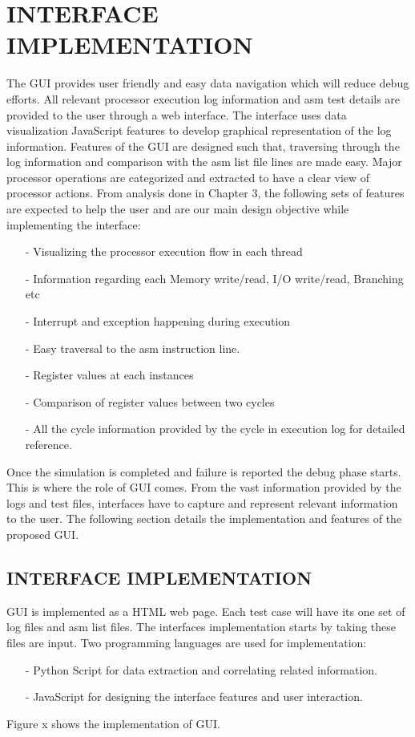 \chapter{INTERFACE IMPLEMENTATION}
\label{chap:GUI_impl.tex}
The GUI provides user friendly and easy data navigation which will reduce debug efforts. All relevant processor execution log information and asm test details are provided to the user through a web interface. The interface uses data visualization JavaScript features to develop graphical representation of the log information. Features of the GUI are designed such that, traversing through the log information and comparison with the asm list file lines are made easy.  Major processor operations are categorized and extracted to have a clear view of processor actions.  From analysis done in Chapter 3, the following sets of features are expected to help the user and are our main design objective while implementing the interface:
\begin{itemize}

\item[-] Visualizing the processor execution flow in each thread
\item[-] Information regarding each Memory write/read, I/O write/read, Branching etc
\item[-] Interrupt and exception happening during execution
\item[-] Easy traversal to the asm instruction line.
\item[-] Register values at each instances
\item[-] Comparison of register values between two cycles
\item[-] All the cycle information provided by the cycle in execution log for detailed reference.
\end{itemize}
Once the simulation is completed and failure is reported the debug phase starts. This is where the role of GUI comes. From the vast information provided by the logs and test files, interfaces have to capture and represent relevant information to the user. The following section details the implementation and features of the proposed GUI. 

\section {INTERFACE IMPLEMENTATION}
GUI is implemented as a HTML web page. Each test case will have its one set of log files and asm list files. The interfaces implementation starts by taking these files are input.  Two programming languages are used for implementation:
\begin{itemize}
\item[-] Python Script for data extraction and correlating related information.
\item[-] JavaScript for designing the interface features and user interaction.
\end{itemize}
Figure x shows the implementation of GUI.

